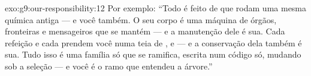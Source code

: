 \begin{solution}{exo:g9:our-responsibility:12}
Por exemplo: ``Todo  é feito de  que rodam uma
mesma química antiga --- e você também. O seu corpo é uma
máquina de órgãos, fronteiras e mensageiros que se mantém ---
e a manutenção dele é sua. Cada refeição e cada 
prendem você numa teia de ,  e
 --- e a conservação dela também é sua. Tudo
isso é uma família só que se ramifica, escrita num código só,
mudando sob a seleção --- e você é o ramo que entendeu a
árvore.''
\end{solution}


